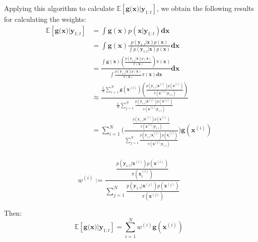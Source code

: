 \documentclass[
]{article}
\begin{document}
Applying this algorithm to calculate
\(\mathbb{E}[\textbf{g(x)}|\textbf{y}_{1:t}]\), we obtain the following
results for calculating the weights: \[
\begin{equation}
    \begin{aligned}
        \mathbb{E}[\textbf{g(x)}|\textbf{y}_{1:t}] &= \int  \textbf{g}(\textbf{x}) p(\textbf{x}|\textbf{y}_{1:t}) \textbf{dx} \\
                                 &= \int  \textbf{g}(\textbf{x}) \frac{p(\textbf{y}_{1:t}|\textbf{x}) p(\textbf{x}) }{\int p(\textbf{y}_{1:t}|\textbf{x})p(\textbf{x})} \textbf{dx} \\
                                 &=    \frac{ \int\textbf{g}(\textbf{x}) (\frac{p(\textbf{y}_{1:t}|\textbf{x}) p(\textbf{x}) }{\pi(\textbf{x})}) \pi(\textbf{x}) }
                                 {\int \frac{p(\textbf{y}_{1:t}|\textbf{x}) p(\textbf{x}) }{\pi(\textbf{x})} \pi(\textbf{x}) \textbf{dx}} \textbf{dx} \\
                                 &\approx \frac{ \frac{1}{N} \sum_{i=1}^N \textbf{g}(\textbf{x}^{(i)}) (\frac{p(\textbf{y}_{1:t}|\textbf{x}^{(i)}) p(\textbf{x}^{(i)}) }{\pi(\textbf{x}^{(i)}|\textbf{y}_{1:t})})  }
                                 {\frac{1}{N} \sum_{j=1}^N \frac{p(\textbf{y}_{1:t}|\textbf{x}^{(j)}) p(\textbf{x}^{(j)}) }{\pi(\textbf{x}^{(j)}|\textbf{y}_{1:t})} } \\
                                 &= \sum_{i=1}^N \bigg(\frac{  \frac{p(\textbf{y}_{1:t}|\textbf{x}^{(i)}) p(\textbf{x}^{(i)}) }{\pi(\textbf{x}^{(i)}|\textbf{y}_{1:t})}  }
                                 {\sum_{j=1}^N \frac{p(\textbf{y}_{1:t}|\textbf{x}_t^{(j)}) p(\textbf{x}_t^{(j)}) }{\pi(\textbf{x}^{(j)}|\textbf{y}_{1:t})} } \bigg)\textbf{g}(\textbf{x}^{(i)}) \\
    \end{aligned}
\end{equation}
\]

\[
\begin{equation*}
    w^{(i)} := \frac{  \frac{p(\textbf{y}_{1:t}|\textbf{x}^{(i)}) p(\textbf{x}^{(i)}) }{\pi(\textbf{x}_{t}^{(i)})}  }
    {\sum_{j=1}^N \frac{p(\textbf{y}_{1:t}|\textbf{x}^{(j)}) p(\textbf{x}^{(j)}) }{\pi(\textbf{x}^{(j)})} }
\end{equation*}
\]

Then: \[
\begin{equation*}
    \mathbb{E}[\textbf{g(x)}|\textbf{y}_{1:t}] = \sum_{i=1}^N w^{(i)}\textbf{g}(\textbf{x}^{(i)})
\end{equation*}
\]
\end{document}

